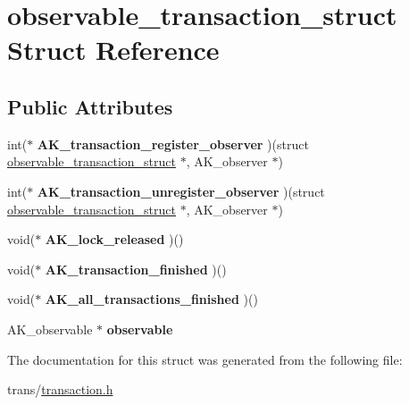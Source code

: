 \hypertarget{structobservable__transaction__struct}{\section{observable\+\_\+transaction\+\_\+struct Struct Reference}
\label{structobservable__transaction__struct}
}
\subsection*{Public Attributes}
\begin{DoxyCompactItemize}
\item 
\hypertarget{structobservable__transaction__struct_acacb2de8ee20b1cd963e52071db80709}{int($\ast$ {\bfseries A\+K\+\_\+transaction\+\_\+register\+\_\+observer} )(struct \hyperlink{structobservable__transaction__struct}{observable\+\_\+transaction\+\_\+struct} $\ast$, A\+K\+\_\+observer $\ast$)}\label{structobservable__transaction__struct_acacb2de8ee20b1cd963e52071db80709}

\item 
\hypertarget{structobservable__transaction__struct_ad1b0af3b866fba1a160f5e460ecc96f2}{int($\ast$ {\bfseries A\+K\+\_\+transaction\+\_\+unregister\+\_\+observer} )(struct \hyperlink{structobservable__transaction__struct}{observable\+\_\+transaction\+\_\+struct} $\ast$, A\+K\+\_\+observer $\ast$)}\label{structobservable__transaction__struct_ad1b0af3b866fba1a160f5e460ecc96f2}

\item 
\hypertarget{structobservable__transaction__struct_a29cd18702b596c9116f5b5bdf2734e34}{void($\ast$ {\bfseries A\+K\+\_\+lock\+\_\+released} )()}\label{structobservable__transaction__struct_a29cd18702b596c9116f5b5bdf2734e34}

\item 
\hypertarget{structobservable__transaction__struct_aa45caf1eefb69c81933d0e4c9731ce50}{void($\ast$ {\bfseries A\+K\+\_\+transaction\+\_\+finished} )()}\label{structobservable__transaction__struct_aa45caf1eefb69c81933d0e4c9731ce50}

\item 
\hypertarget{structobservable__transaction__struct_ac260f7d6431664f5dd41f94517b51b80}{void($\ast$ {\bfseries A\+K\+\_\+all\+\_\+transactions\+\_\+finished} )()}\label{structobservable__transaction__struct_ac260f7d6431664f5dd41f94517b51b80}

\item 
\hypertarget{structobservable__transaction__struct_ac03a8590cbe1010bef9153196eaaba82}{A\+K\+\_\+observable $\ast$ {\bfseries observable}}\label{structobservable__transaction__struct_ac03a8590cbe1010bef9153196eaaba82}

\end{DoxyCompactItemize}


The documentation for this struct was generated from the following file\+:\begin{DoxyCompactItemize}
\item 
trans/\hyperlink{transaction_8h}{transaction.\+h}\end{DoxyCompactItemize}
